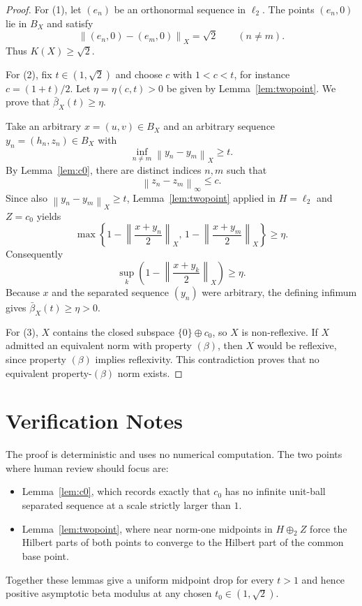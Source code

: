 \documentclass[11pt]{article}
\newcommand{\norm}[1]{\left\lVert #1 \right\rVert}
\newcommand{\bbeta}{\bar{\beta}}
\begin{document}
\begin{proof}
For (1), let $(e_n)$ be an orthonormal sequence in $\ell_2$.  The points
$(e_n,0)$ lie in $B_X$ and satisfy
\[
  \norm{(e_n,0)-(e_m,0)}_X=\sqrt2
  \qquad(n\ne m).
\]
Thus $K(X)\ge\sqrt2$.

For (2), fix $t\in(1,\sqrt2)$ and choose $c$ with $1<c<t$, for instance
$c=(1+t)/2$.  Let $\eta=\eta(c,t)>0$ be given by Lemma~\ref{lem:twopoint}.
We prove that $\bbeta_X(t)\ge\eta$.

Take an arbitrary $x=(u,v)\in B_X$ and an arbitrary sequence
$y_n=(h_n,z_n)\in B_X$ with
\[
  \inf_{n\ne m}\norm{y_n-y_m}_X\ge t.
\]
By Lemma~\ref{lem:c0}, there are distinct indices $n,m$ such that
\[
  \norm{z_n-z_m}_\infty\le c.
\]
Since also $\norm{y_n-y_m}_X\ge t$, Lemma~\ref{lem:twopoint} applied in
$H=\ell_2$ and $Z=c_0$ yields
\[
  \max\left\{
  1-\norm{\frac{x+y_n}{2}}_X,\,
  1-\norm{\frac{x+y_m}{2}}_X
  \right\}\ge \eta .
\]
Consequently
\[
  \sup_k\left(1-\norm{\frac{x+y_k}{2}}_X\right)\ge \eta .
\]
Because $x$ and the separated sequence $(y_n)$ were arbitrary, the defining
infimum gives $\bbeta_X(t)\ge\eta>0$.

For (3), $X$ contains the closed subspace $\{0\}\oplus c_0$, so $X$ is
non-reflexive.  If $X$ admitted an equivalent norm with property $(\beta)$,
then $X$ would be reflexive, since property $(\beta)$ implies reflexivity.
This contradiction proves that no equivalent property-$(\beta)$ norm exists.
\end{proof}

\section*{Verification Notes}

The proof is deterministic and uses no numerical computation.  The two points
where human review should focus are:
\begin{itemize}
\item Lemma~\ref{lem:c0}, which records exactly that $c_0$ has no infinite
unit-ball separated sequence at a scale strictly larger than $1$.
\item Lemma~\ref{lem:twopoint}, where near norm-one midpoints in
$H\oplus_2 Z$ force the Hilbert parts of both points to converge to the
Hilbert part of the common base point.
\end{itemize}
Together these lemmas give a uniform midpoint drop for every $t>1$ and hence
positive asymptotic beta modulus at any chosen $t_0\in(1,\sqrt2)$.
\end{document}
